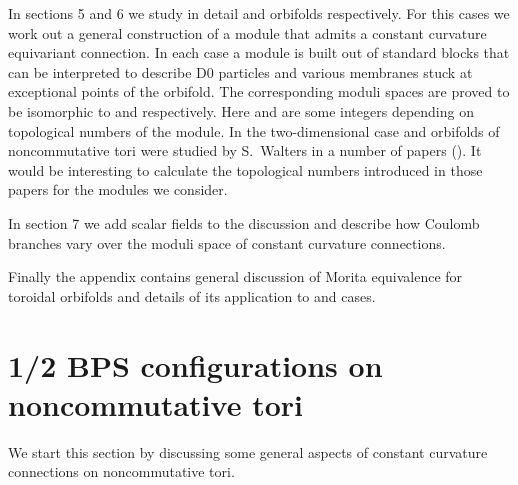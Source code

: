 \documentclass[a4paper,a4paper]{article}
\begin{document}
In sections 5 and 6 we study in detail \coordHE{} and \coordHE{} orbifolds respectively. 
For this cases we work out  a general construction of a module that admits a constant curvature equivariant connection.
In each case a module is built out of standard blocks that can be interpreted to describe D0 particles and 
various membranes stuck at exceptional points of the orbifold. The corresponding moduli spaces are proved to be 
isomorphic to \coordHE{} and  \coordHE{} respectively. 
Here \coordHE{} and \coordHE{} are some integers depending on  topological numbers of the module. 
In the two-dimensional case \coordHE{} and \coordHE{} orbifolds of  noncommutative tori were 
studied by S.~Walters in a number of papers (\cite{Walters}). It would be interesting to calculate the topological 
numbers introduced in those papers for the modules we consider.
  

In section 7 we add scalar fields to the discussion and describe how Coulomb branches vary over 
the moduli space of constant curvature connections. 

Finally the appendix contains general discussion of Morita equivalence for toroidal orbifolds and 
details of its application to \coordHE{} and \coordHE{} cases. 

\section{ 1/2 BPS configurations on noncommutative tori}
We start this section by discussing  some general aspects 
of constant curvature connections on noncommutative tori. 
\end{document}
